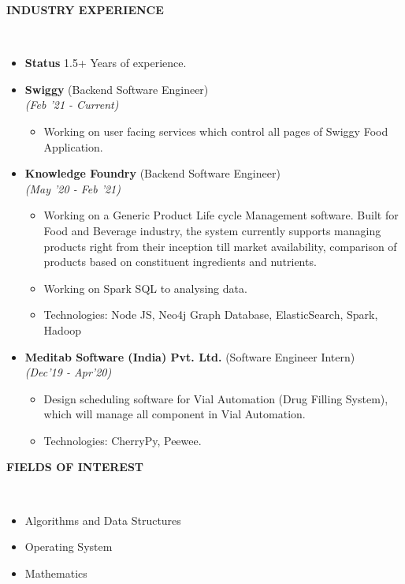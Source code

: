 \documentclass[a4paper,10pt]{article}
\newcommand{\isep}{-2 pt}
\newcommand{\lsep}{-0.5cm}
\newcommand{\resheading}[1]{{\small \colorbox{mygrey}{\begin{minipage}{0.975\textwidth}{\textbf{#1 \vphantom{p\^{E}}}}\end{minipage}}}}
\begin{document}
\resheading{\textbf{INDUSTRY EXPERIENCE} }\\[\lsep]

\begin{itemize}\itemsep \isep

\item \noindent \textbf{Status} 1.5+ Years of experience.

\item \noindent \textbf{Swiggy} (Backend Software Engineer) \\\emph{(Feb '21 - Current)} \\[-0.6cm]
\begin{itemize}\itemsep \isep
\item \noindent Working on user facing services which control all pages of Swiggy Food Application.
\end{itemize}

\item \noindent \textbf{Knowledge Foundry} (Backend Software Engineer) \\\emph{(May '20 - Feb '21)} \\[-0.6cm]
\begin{itemize}\itemsep \isep
\item \noindent Working on a Generic Product Life cycle Management software. Built for Food and Beverage industry, the system currently supports managing products right from their inception till market availability, comparison of products based on constituent ingredients and nutrients.
\item \noindent Working on Spark SQL to analysing data.
\item \noindent Technologies:  Node JS, Neo4j Graph Database, ElasticSearch, Spark, Hadoop
\end{itemize}
\item \noindent \textbf{Meditab Software (India) Pvt. Ltd.} (Software Engineer Intern) \\\emph{(Dec'19 - Apr'20)} \\[-0.6cm]
\begin{itemize}\itemsep \isep
\item \noindent Design scheduling software for Vial Automation (Drug Filling System), which will manage all component in Vial Automation.
\item \noindent Technologies: CherryPy, Peewee. 
\end{itemize}
\end{itemize}

\resheading{\textbf{FIELDS OF INTEREST} }\\[\lsep]
\begin{itemize}\itemsep \isep
\item \noindent Algorithms and Data Structures
\item \noindent Operating System
\item \noindent Mathematics
\end{itemize}
\end{document}
